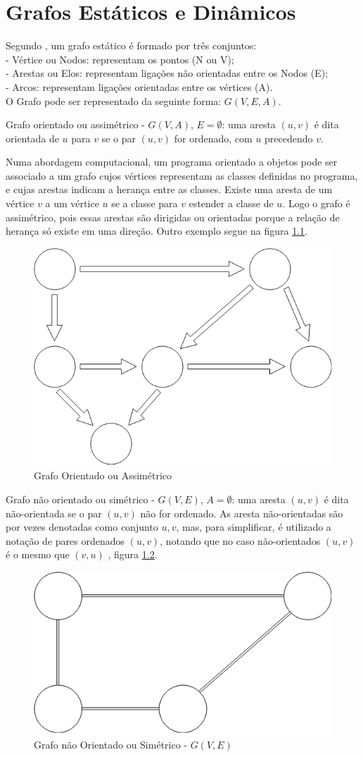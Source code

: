 \chapter{Grafos Estáticos e Dinâmicos} \label{grafoestdin}
Segundo \cite{negreirosbook}, um grafo estático é formado por três conjuntos:\\
- Vértice ou Nodos: representam os pontos (N ou V);\\
- Arestas ou Elos: representam ligações não orientadas entre os Nodos (E);\\
- Arcos: representam ligações orientadas entre os vértices (A).\\
O Grafo pode ser representado da seguinte forma: $G(V, E, A)$.

Grafo orientado ou assimétrico - $G(V, A)$, $E = \emptyset$: uma aresta $(u,v)$ é dita orientada de $u$
para $v$ se o par $(u,v)$ for ordenado, com $u$ precedendo $v$.

Numa abordagem computacional, um programa orientado a objetos pode ser associado a um grafo cujos vértices
representam as classes definidas no programa, e cujas arestas indicam a herança entre as classes.
Existe uma aresta de um vértice $v$ a um vértice $u$ se a classe para $v$ estender a classe de $u$.
Logo o grafo é assimétrico, pois essas arestas são dirigidas ou orientadas porque a relação de herança
só existe em uma direção. Outro exemplo segue na figura \ref{fig:assimetrico}.

\begin{figure}[htbp]
\centering
 \includegraphics[width=.35\textwidth]{figuras/assimetrico1.png}
\caption{Grafo Orientado ou Assimétrico}
\label{fig:assimetrico}
\end{figure}

Grafo não orientado ou simétrico - $G(V, E)$, $A = \emptyset$: uma aresta $(u,v)$ é dita não-orientada
se o par $(u,v)$ não for ordenado. As aresta não-orientadas são por vezes denotadas como conjunto ${u,v}$,
mas, para simplificar, é utilizado a notação de pares ordenados $(u,v)$, notando que no caso não-orientados
$(u,v)$ é o mesmo que $(v,u)$ \cite{goodrich}, figura \ref{fig:simetrico}.

\begin{figure}[htbp]
\centering
 \includegraphics[width=.35\textwidth]{figuras/simetrico1.png}
\caption{Grafo não Orientado ou Simétrico - $G(V,E)$}
\label{fig:simetrico}
\end{figure}
\FloatBarrier

